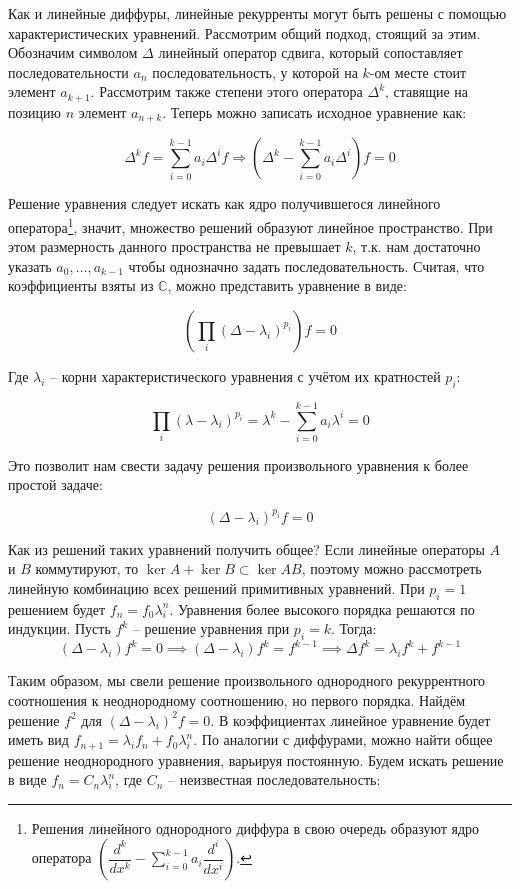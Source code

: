 \documentclass{article}
\begin{document}
Как и линейные диффуры, линейные рекурренты могут быть решены с помощью характеристических уравнений. Рассмотрим общий подход, стоящий за этим. Обозначим символом $\Delta$ линейный оператор сдвига, который сопоставляет последовательности $a_n$ последовательность, у которой на $k$-ом месте стоит элемент $a_{k+1}$. Рассмотрим также степени этого оператора $\Delta^k$, ставящие на позицию $n$ элемент $a_{n+k}$. Теперь можно записать исходное уравнение как:

$$\Delta^k f = \sum\limits_{i=0}^{k-1} a_i \Delta^i f \Longrightarrow \left(\Delta^k - \sum\limits_{i=0}^{k-1} a_i \Delta^i\right) f=0$$

Решение уравнения следует искать как ядро получившегося линейного оператора\footnote{Решения линейного однородного диффура в свою очередь образуют ядро оператора $\left(\dfrac{d^k}{dx^k}-\sum\limits_{i=0}^{k-1} a_i \dfrac{d^i}{dx^i}\right)$.}, значит, множество решений образуют линейное пространство. При этом размерность данного пространства не превышает $k$, т.к. нам достаточно указать $a_0,\dots,a_{k-1}$ чтобы однозначно задать последовательность. Считая, что коэффициенты взяты из $\mathbb C$, можно представить уравнение в виде:

$$\left(\prod\limits_{i}(\Delta-\lambda_i)^{p_i}\right)f=0$$

Где $\lambda_i$ -- корни характеристического уравнения с учётом их кратностей $p_i$:

$$\prod\limits_i (\lambda -\lambda_i)^{p_i}=\lambda^k - \sum\limits_{i=0}^{k-1} a_i \lambda^i = 0$$

Это позволит нам свести задачу решения произвольного уравнения к более простой задаче:

$$(\Delta-\lambda_i)^{p_i}f=0$$

Как из решений таких уравнений получить общее? Если линейные операторы $A$ и $B$ коммутируют, то $\ker A + \ker B \subset \ker AB$, поэтому можно рассмотреть линейную комбинацию всех решений примитивных уравнений. При $p_i=1$ решением будет $f_n = f_0 \lambda_i^n$. Уравнения более высокого порядка решаются по индукции. Пусть $f^k$ -- решение уравнения при $p_i=k$. Тогда:
\begin{equation*}
    [(\Delta - \lambda_i)^{k-1}](\Delta - \lambda_i) f^k = 0 \implies (\Delta - \lambda_i) f^k = f^{k-1} \implies \Delta f^k = \lambda_i f^k + f^{k-1}
\end{equation*}

Таким образом, мы свели решение произвольного однородного рекуррентного соотношения к неоднородному соотношению, но первого порядка. Найдём решение $f^2$ для $(\Delta-\lambda_i)^2f=0$. В коэффициентах линейное уравнение будет иметь вид $f_{n+1} = \lambda_i f_n +f_0\lambda_i^n$. По аналогии с диффурами, можно найти общее решение неоднородного уравнения, варьируя постоянную. Будем искать решение в виде $f_n=C_n \lambda_i^n$, где $C_n$ -- неизвестная последовательность:
\end{document}
